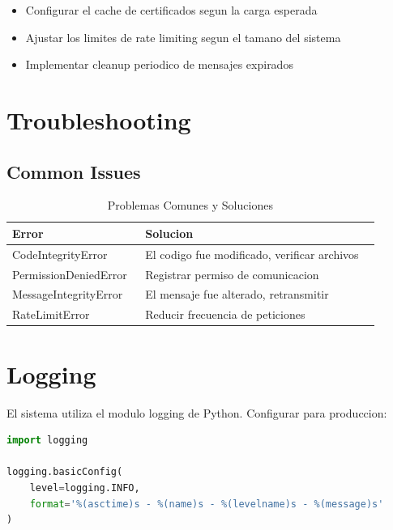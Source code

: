 \documentclass[12pt,a4paper]{report}
\newcommand{\pkg}[1]{\textsf{#1}}
\begin{document}
\begin{itemize}
    \item Configurar el cache de certificados segun la carga esperada
    \item Ajustar los limites de rate limiting segun el tamano del sistema
    \item Implementar cleanup periodico de mensajes expirados
\end{itemize}

\section{Troubleshooting}

\subsection{Common Issues}

\begin{table}[H]
    \centering
    \begin{tabular}{p{0.3\linewidth}p{0.6\linewidth}}
        \toprule
        \textbf{Error} & \textbf{Solucion} \\
        \midrule
        CodeIntegrityError & El codigo fue modificado, verificar archivos \\
        PermissionDeniedError & Registrar permiso de comunicacion \\
        MessageIntegrityError & El mensaje fue alterado, retransmitir \\
        RateLimitError & Reducir frecuencia de peticiones \\
        \bottomrule
    \end{tabular}
    \caption{Problemas Comunes y Soluciones}
\end{table}

\section{Logging}

El sistema utiliza el modulo \pkg{logging} de Python. Configurar para produccion:

\begin{lstlisting}[language=python, caption={Logging Configuration}]
import logging

logging.basicConfig(
    level=logging.INFO,
    format='%(asctime)s - %(name)s - %(levelname)s - %(message)s'
)
\end{lstlisting}

\cleardoublepage
\end{document}
